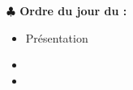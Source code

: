 \documentclass[a4paper, 10pt]{report}
\newenvironment{ordre}[1][]
    {
    \noindent\textbf{\textcolor{vert-0}{$\clubsuit$  Ordre du jour du #1 : }}
    }
    {
    }
\begin{document}
\begin{ordre}[]
\end{ordre}
\begin{itemize}
 \item Présentation
 \item
 \item 
\end{itemize}
\end{document}
